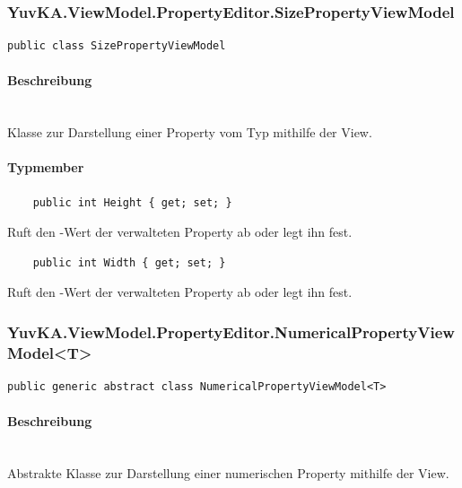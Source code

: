 \subsubsection{YuvKA.ViewModel.PropertyEditor.SizePropertyViewModel}

\begin{verbatim}
public class SizePropertyViewModel
\end{verbatim}

\paragraph{Beschreibung}~\\
Klasse zur Darstellung einer Property vom Typ  mithilfe der View.

\paragraph{Typmember}
\begin{itemize}
	
	\begin{verbatim}
	public int Height { get; set; }
	\end{verbatim}
	Ruft den -Wert der verwalteten  Property ab oder legt ihn fest.

	\begin{verbatim}
	public int Width { get; set; }
	\end{verbatim}
	Ruft den -Wert der verwalteten  Property ab oder legt ihn fest.

\end{itemize}




\subsubsection{YuvKA.ViewModel.PropertyEditor.NumericalPropertyViewModel\textless T\textgreater}

\begin{verbatim}
public generic abstract class NumericalPropertyViewModel<T>
\end{verbatim}

\paragraph{Beschreibung}~\\
Abstrakte Klasse zur Darstellung einer numerischen Property mithilfe der View.

